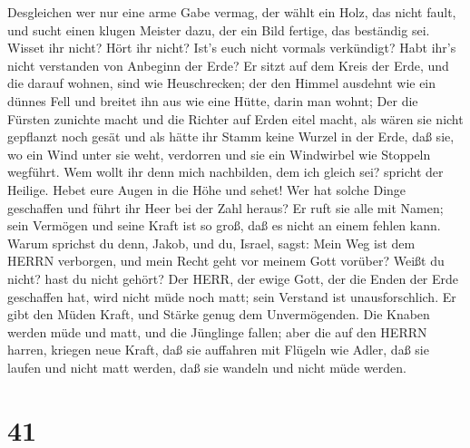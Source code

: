 Desgleichen wer nur eine arme Gabe vermag, der wählt ein Holz, das nicht
fault, und sucht einen klugen Meister dazu, der ein Bild fertige, das
beständig sei.  Wisset ihr nicht? Hört ihr nicht? Ist's
euch nicht vormals verkündigt? Habt ihr's nicht verstanden von Anbeginn
der Erde?  Er sitzt auf dem Kreis der Erde, und die darauf
wohnen, sind wie Heuschrecken; der den Himmel ausdehnt wie ein dünnes
Fell und breitet ihn aus wie eine Hütte, darin man wohnt; 
Der die Fürsten zunichte macht und die Richter auf Erden eitel macht,
 als wären sie nicht gepflanzt noch gesät und als hätte ihr
Stamm keine Wurzel in der Erde, daß sie, wo ein Wind unter sie weht,
verdorren und sie ein Windwirbel wie Stoppeln wegführt. 
Wem wollt ihr denn mich nachbilden, dem ich gleich sei? spricht der
Heilige.  Hebet eure Augen in die Höhe und sehet! Wer hat
solche Dinge geschaffen und führt ihr Heer bei der Zahl heraus? Er ruft
sie alle mit Namen; sein Vermögen und seine Kraft ist so groß, daß es
nicht an einem fehlen kann.  Warum sprichst du denn, Jakob,
und du, Israel, sagst: Mein Weg ist dem HERRN verborgen, und mein Recht
geht vor meinem Gott vorüber?  Weißt du nicht? hast du
nicht gehört? Der HERR, der ewige Gott, der die Enden der Erde
geschaffen hat, wird nicht müde noch matt; sein Verstand ist
unausforschlich.  Er gibt den Müden Kraft, und Stärke genug
dem Unvermögenden.  Die Knaben werden müde und matt, und
die Jünglinge fallen;  aber die auf den HERRN harren,
kriegen neue Kraft, daß sie auffahren mit Flügeln wie Adler, daß sie
laufen und nicht matt werden, daß sie wandeln und nicht müde werden.

\hypertarget{section-40}{%
\section{41}\label{section-40}}

